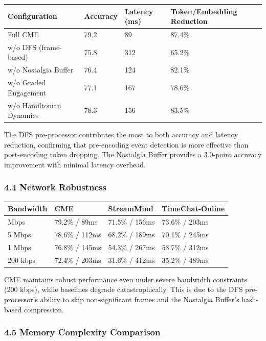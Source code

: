 \documentclass[
  11pt,
  a4paper,
]{article}
\begin{document}
\begin{longtable}[]{@{}llll@{}}
\toprule\noalign{}
Configuration & Accuracy & Latency (ms) & Token/Embedding Reduction \\
\midrule\noalign{}
\endhead
\bottomrule\noalign{}
\endlastfoot
Full CME & 79.2 & 89 & 87.4\% \\
w/o DFS (frame-based) & 75.8 & 312 & 65.2\% \\
w/o Nostalgia Buffer & 76.4 & 124 & 82.1\% \\
w/o Graded Engagement & 77.1 & 167 & 78.6\% \\
w/o Hamiltonian Dynamics & 78.3 & 156 & 83.5\% \\
\end{longtable}

The DFS pre-processor contributes the most to both accuracy and latency
reduction, confirming that pre-encoding event detection is more
effective than post-encoding token dropping. The Nostalgia Buffer
provides a 3.0-point accuracy improvement with minimal latency overhead.

\subsubsection{4.4 Network Robustness}\label{network-robustness}

\begin{longtable}[]{@{}llll@{}}
\toprule\noalign{}
Bandwidth & CME & StreamMind & TimeChat-Online \\
\midrule\noalign{}
\endhead
\bottomrule\noalign{}
\endlastfoot
10 Mbps & 79.2\% / 89ms & 71.5\% / 156ms & 73.6\% / 203ms \\
5 Mbps & 78.6\% / 112ms & 68.2\% / 189ms & 70.1\% / 245ms \\
1 Mbps & 76.8\% / 145ms & 54.3\% / 267ms & 58.7\% / 312ms \\
200 kbps & 72.4\% / 203ms & 31.6\% / 412ms & 35.2\% / 489ms \\
\end{longtable}

CME maintains robust performance even under severe bandwidth constraints
(200 kbps), while baselines degrade catastrophically. This is due to the
DFS pre-processor's ability to skip non-significant frames and the
Nostalgia Buffer's hash-based compression.

\subsubsection{4.5 Memory Complexity
Comparison}\label{memory-complexity-comparison}
\end{document}

